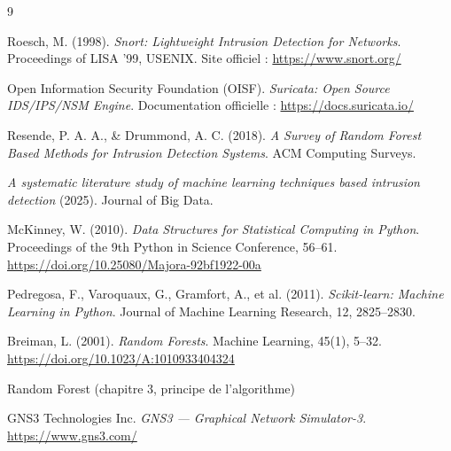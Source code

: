 \documentclass[12pt,a4paper]{report}
\begin{document}
\tableofcontents
\listoffigures
\listoftables
\clearpage









\begin{thebibliography}{9}

Roesch, M. (1998).
\textit{Snort: Lightweight Intrusion Detection for Networks}.
Proceedings of LISA '99, USENIX.
Site officiel : \url{https://www.snort.org/}

Open Information Security Foundation (OISF).
\textit{Suricata: Open Source IDS/IPS/NSM Engine}.
Documentation officielle : \url{https://docs.suricata.io/}

Resende, P. A. A., \& Drummond, A. C. (2018).
\textit{A Survey of Random Forest Based Methods for Intrusion Detection Systems}.
ACM Computing Surveys.

\textit{A systematic literature study of machine learning techniques based intrusion detection} (2025).
Journal of Big Data.

McKinney, W. (2010).
\textit{Data Structures for Statistical Computing in Python}.
Proceedings of the 9th Python in Science Conference, 56--61.
\url{https://doi.org/10.25080/Majora-92bf1922-00a}

Pedregosa, F., Varoquaux, G., Gramfort, A., et al. (2011).
\textit{Scikit-learn: Machine Learning in Python}.
Journal of Machine Learning Research, 12, 2825--2830.

Breiman, L. (2001).
\textit{Random Forests}.
Machine Learning, 45(1), 5--32.
\url{https://doi.org/10.1023/A:1010933404324}

Random Forest (chapitre 3, principe de l'algorithme)

GNS3 Technologies Inc.
\textit{GNS3 --- Graphical Network Simulator-3}.
\url{https://www.gns3.com/}

\end{thebibliography}
\end{document}
